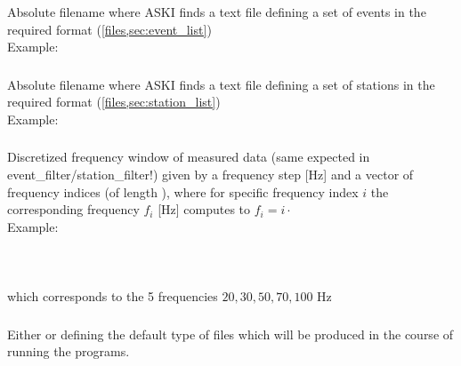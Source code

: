 \subsubsection{} \label{files,sec:main_parfile,itm:file_event_list}
Absolute filename where ASKI finds a text file defining a set of events in the required format 
(\ref{files,sec:event_list})\\
Example: 
\subsubsection{} \label{files,sec:main_parfile,itm:file_station_list}
Absolute filename where ASKI finds a text file defining a set of stations in the required format 
(\ref{files,sec:station_list})\\
Example: 
\subsubsection{} 
\label{files,sec:main_parfile,itm:mdata_freq}
Discretized frequency window of measured data (same expected in event\_filter/station\_filter!) given by a frequency 
step  [Hz] and a vector of frequency indices 
(of length ), where for specific frequency index $i$ the corresponding frequency $f_i$ [Hz] 
computes to $f_i = i \cdot$ \\
Example:\\
\\
\\
\\
which corresponds to the 5 frequencies $20,30,50,70,100$ Hz
\subsubsection{} 
Either  or  defining the default type of  files 
which will be produced in the course of running the programs.
%
